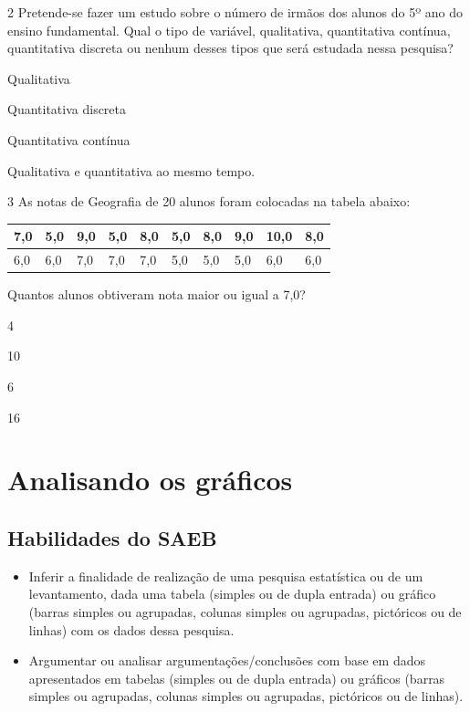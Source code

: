 \num{2} Pretende-se fazer um estudo sobre o número de irmãos dos alunos do
5º ano do ensino fundamental. Qual o tipo de variável, qualitativa,
quantitativa contínua, quantitativa discreta ou nenhum desses tipos que
será estudada nessa pesquisa?

\begin{minipage}{.5\textwidth}
\begin{escolha}
\item
  Qualitativa
\item
  Quantitativa discreta
\item
  Quantitativa contínua
\item
  Qualitativa e quantitativa ao mesmo tempo.
\end{escolha}
\end{minipage}


\num{3} As notas de Geografia de 20 alunos foram colocadas na tabela
abaixo:

\begin{longtable}[]{@{}llllllllll@{}}
\toprule
7,0 & 5,0 & 9,0 & 5,0 & 8,0 & 5,0 & 8,0 & 9,0 & 10,0 &
8,0\tabularnewline
\midrule
\endhead
6,0 & 6,0 & 7,0 & 7,0 & 7,0 & 5,0 & 5,0 & 5,0 & 6,0 & 6,0\tabularnewline
\bottomrule
\end{longtable}

Quantos alunos obtiveram nota maior ou igual a 7,0?

\begin{minipage}{.5\textwidth}
\begin{escolha}
\item
  4
\item
  10
\item
  6
\item
  16
\end{escolha}
\end{minipage}


\chapter{Analisando os gráficos}

\section*{Habilidades do SAEB}

\begin{itemize}
\item Inferir a finalidade de realização de uma pesquisa estatística ou de
um levantamento, dada uma tabela (simples ou de dupla entrada) ou
gráfico (barras simples ou agrupadas, colunas simples ou agrupadas,
pictóricos ou de linhas) com os dados dessa pesquisa.

\item Argumentar ou analisar argumentações/conclusões com base em dados
apresentados em tabelas (simples ou de dupla entrada) ou gráficos
(barras simples ou agrupadas, colunas simples ou agrupadas, pictóricos
ou de linhas).
\end{itemize}

